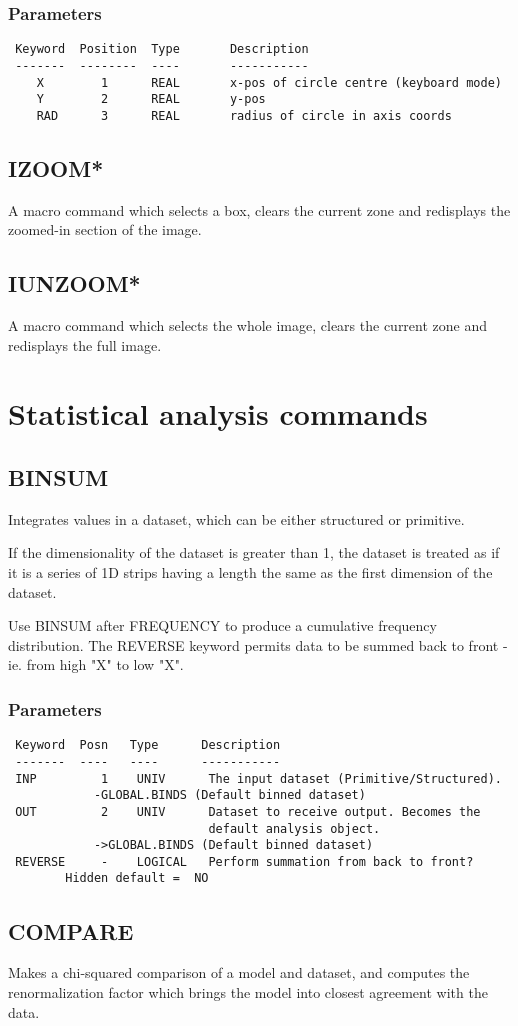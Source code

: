 \documentclass{book}
\renewcommand{\_}{{\tt\char'137}}     %
\begin{document}
\subsection{Parameters}
\begin{verbatim}
 Keyword  Position  Type       Description
 -------  --------  ----       -----------
    X        1      REAL       x-pos of circle centre (keyboard mode)
    Y        2      REAL       y-pos
    RAD      3      REAL       radius of circle in axis coords

\end{verbatim}\section{IZOOM*}
A macro command which selects a box, clears the current zone and
redisplays the zoomed-in section of the image.
\section{IUNZOOM*}
A macro command which selects the whole image, clears the current
zone and redisplays the full image.

\chapter{Statistical analysis commands}
\section{BINSUM}
Integrates values in a dataset, which can be either structured
or primitive.

If the dimensionality of the dataset is greater than 1, the
dataset is treated as if it is a series of 1D strips having
a length the same as the first dimension of the dataset.

Use BINSUM after FREQUENCY to produce a cumulative
frequency distribution. The REVERSE keyword permits data to
be summed back to front - ie. from high "X" to low "X".

\subsection{Parameters}
\begin{verbatim}
 Keyword  Posn   Type      Description
 -------  ----   ----      -----------
 INP         1    UNIV      The input dataset (Primitive/Structured).
            -GLOBAL.BINDS (Default binned dataset)
 OUT         2    UNIV      Dataset to receive output. Becomes the
                            default analysis object.
            ->GLOBAL.BINDS (Default binned dataset)
 REVERSE     -    LOGICAL   Perform summation from back to front?
        Hidden default =  NO

\end{verbatim}\section{COMPARE}
Makes a chi-squared comparison of a model and dataset, and
computes the renormalization factor which brings the model into
closest agreement with the data.
\end{document}

